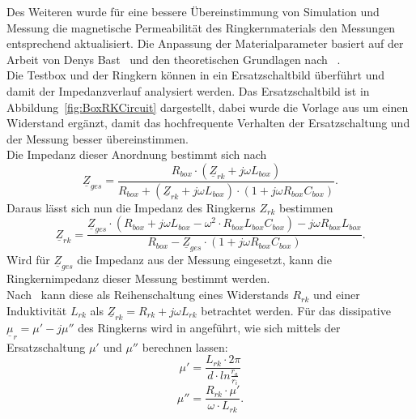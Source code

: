             \par
            Des Weiteren wurde für eine bessere Übereinstimmung von Simulation und Messung die magnetische Permeabilität des Ringkernmaterials den Messungen entsprechend aktualisiert. Die Anpassung der Materialparameter basiert auf der Arbeit von Denys Bast~\citep{bast2017ba} und den theoretischen Grundlagen nach ~\citep{Klingbeil2008}.\\
            Die Testbox und der Ringkern können in ein Ersatzschaltbild überführt und damit der Impedanzverlauf analysiert werden. Das Ersatzschaltbild ist in Abbildung~\ref{fig:BoxRKCircuit} dargestellt, dabei wurde die Vorlage aus \citep{bast2017ba} um einen Widerstand ergänzt, damit das hochfrequente Verhalten der Ersatzschaltung und der Messung besser übereinstimmen.\\
            Die Impedanz dieser Anordnung bestimmt sich nach
                \begin{equation}\label{eq:Zges}
                    \underline{Z}_{ges} = \frac{R_{box}\cdot(\underline{Z}_{rk}+j\omega L_{box})}{R_{box}+(\underline{Z}_{rk}+j\omega L_{box})\cdot(1+j\omega R_{box}C_{box})}.
                \end{equation}
            Daraus lässt sich nun die Impedanz des Ringkerns $Z_{rk}$ bestimmen
                \begin{equation}\label{eq:Zrk}
                \underline{Z}_{rk} = \frac{\underline{Z}_{ges}\cdot(R_{box}+j\omega L_{box}-\omega^2\cdot R_{box}L_{box}C_{box}) - j\omega R_{box}L_{box}}{R_{box}-\underline{Z}_{ges}\cdot(1+j\omega R_{box}C_{box})}.
                \end{equation}
            Wird für $\underline{Z}_{ges}$ die Impedanz aus der Messung eingesetzt, kann die Ringkernimpedanz dieser Messung bestimmt werden.\\
            Nach~\cite{Klingbeil2008} kann diese als Reihenschaltung eines Widerstands $R_{rk}$ und einer Induktivität $L_{rk}$ als $\underline{Z}_{rk} = R_{rk}+j\omega L_{rk}$ betrachtet werden. Für das dissipative $\underline{\mu}_r = \mu' -j\mu''$  des Ringkerns wird in \cite{bast2017ba} angeführt, wie sich mittels der Ersatzschaltung $\mu'$ und $\mu''$ berechnen lassen:
                \begin{equation}
                    \mu' = \frac{L_{rk}\cdot 2\pi}{d\cdot ln\frac{r_a}{r_i}}
                \end{equation} 
                \begin{equation}
                \mu'' = \frac{R_{rk}\cdot\mu'}{\omega\cdot L_{rk}} .
                \end{equation}
            
